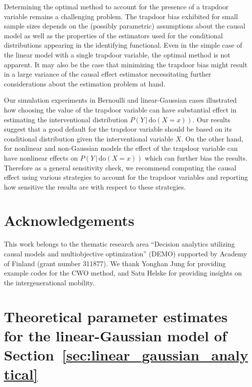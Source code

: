 \documentclass[11pt,a4paper,twoside]{article}
\newcommand{\+}[1]{\ensuremath{\mathbf{#1}}}
\newcommand{\doo}{\textrm{do}}
\newcommand{\given}{{ \, | \, }}
\newcommand{\z}{trapdoor variable}
\begin{document}
	Determining the optimal method to account for the presence of a trapdoor variable remains a challenging problem. The trapdoor bias exhibited for small sample sizes depends on the (possibly parametric) assumptions about the causal model as well as the properties of the estimators used for the conditional distributions appearing in the identifying functional. Even in the simple case of the linear model with a single trapdoor variable, the optimal method is not apparent. It may also be the case that minimizing the trapdoor bias might result in a large variance of the causal effect estimator necessitating further considerations about the estimation problem at hand.
	
	Our simulation experiments in  Bernoulli and linear-Gaussian cases illustrated how choosing the value of the \z{} can have substantial effect in estimating the interventional distribution $P(Y \given \doo(X = x))$. Our results suggest that a good default for the \z{} should be based on its conditional distribution given the interventional variable $X$. On the other hand, for nonlinear and non-Gaussian models the effect of the \z{} can have nonlinear effects on $P(Y \given \doo(X = x))$ which can further bias the results. Therefore as a general sensitivity check, we recommend computing the causal effect using various strategies to account for the \z{}s and reporting how sensitive the results are with respect to these strategies.
	
	\section{Acknowledgements}
	
	This work belongs to the thematic research area ``Decision analytics utilizing causal models and multiobjective optimization'' (DEMO) supported by Academy of Finland (grant number 311877). We thank Yonghan Jung for providing example codes for the CWO method, and Satu Helske for providing insights on the intergenerational mobility.
		
	\appendix
	
	\section{Theoretical parameter estimates for the linear-Gaussian model of Section~\ref{sec:linear_gaussian_analytical}}
	\label{sec:appendix}
	
\end{document}
